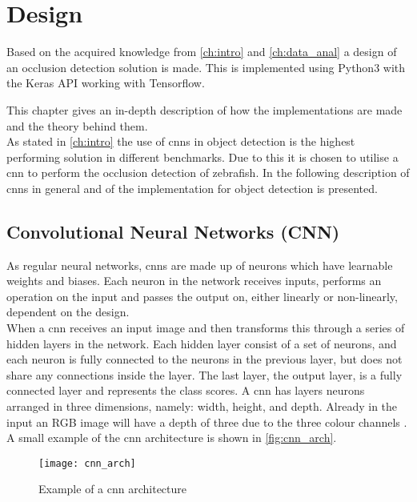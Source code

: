 \graphicspath{{figures/design/}}
\chapter{Design}\label{ch:design}
Based on the acquired knowledge from \autoref{ch:intro} and \autoref{ch:data_anal} a design of an occlusion detection solution is made. This is implemented using Python3 with the Keras API working with Tensorflow.

This chapter gives an in-depth description of how the implementations are made and the theory behind them.\\

As stated in \autoref{ch:intro} the use of \gls{cnn}s in object detection is the highest performing solution in different benchmarks. Due to this it is chosen to utilise a \gls{cnn} to perform the occlusion detection of zebrafish. In the following description of \gls{cnn}s in general and of the implementation for object detection is presented.

\section{Convolutional Neural Networks (CNN)}
As regular neural networks, \gls{cnn}s are made up of neurons which have learnable weights and biases. Each neuron in the network receives inputs, performs an operation on the input and passes the output on, either linearly or non-linearly, dependent on the design.\\

When a \gls{cnn} receives an input image and then transforms this through a series of hidden layers in the network. Each hidden layer consist of a set of neurons, and each neuron is fully connected to the neurons in the previous layer, but does not share any connections inside the layer. The last layer, the output layer, is a fully connected layer and represents the class scores. A \gls{cnn} has layers neurons arranged in three dimensions, namely: width, height, and depth. Already in the input an RGB image will have a depth of three due to the three colour channels \citep{Karpathy2016b}. A small example of the \gls{cnn} architecture is shown in \autoref{fig:cnn_arch}.

\begin{figure}[H]
	\centering
	\texttt{[image: cnn\_arch]}
	\caption{Example of a \gls{cnn} architecture}
	\label{fig:cnn_arch}
\end{figure}

